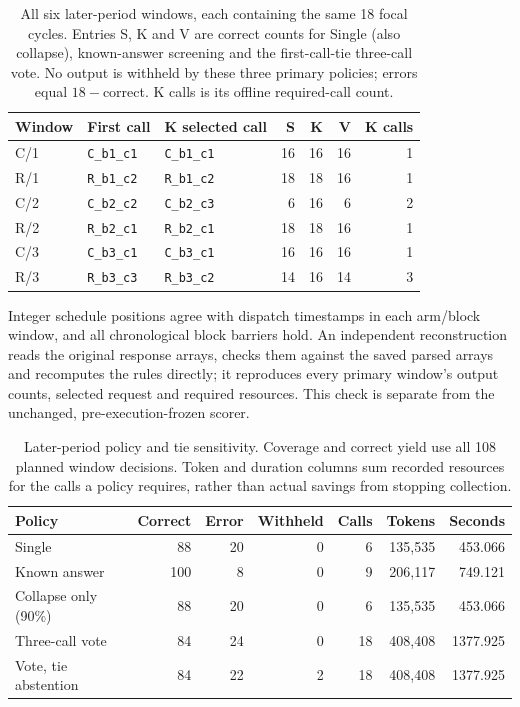 \begin{table}[htbp]\centering\small
\caption{All six later-period windows, each containing the same 18 focal cycles. Entries S, K and V are correct counts for Single (also collapse), known-answer screening and the first-call-tie three-call vote. No output is withheld by these three primary policies; errors equal $18-$correct. K calls is its offline required-call count.}
\label{tab:canary_stability_windows}
\begin{tabular}{@{}ll lrrrr@{}}\toprule
Window & First call & K selected call & S & K & V & K calls \\\midrule
C/1 & \texttt{C\_b1\_c1} & \texttt{C\_b1\_c1} & 16 & 16 & 16 & 1 \\
R/1 & \texttt{R\_b1\_c2} & \texttt{R\_b1\_c2} & 18 & 18 & 16 & 1 \\
C/2 & \texttt{C\_b2\_c2} & \texttt{C\_b2\_c3} & 6 & 16 & 6 & 2 \\
R/2 & \texttt{R\_b2\_c1} & \texttt{R\_b2\_c1} & 18 & 18 & 16 & 1 \\
C/3 & \texttt{C\_b3\_c1} & \texttt{C\_b3\_c1} & 16 & 16 & 16 & 1 \\
R/3 & \texttt{R\_b3\_c3} & \texttt{R\_b3\_c2} & 14 & 16 & 14 & 3 \\
\bottomrule\end{tabular}\end{table}

Integer schedule positions agree with dispatch timestamps in each arm/block window, and all chronological block barriers hold. An independent reconstruction reads the original response arrays, checks them against the saved parsed arrays and recomputes the rules directly; it reproduces every primary window's output counts, selected request and required resources. This check is separate from the unchanged, pre-execution-frozen scorer.

\begin{table}[htbp]\centering\small
\caption{Later-period policy and tie sensitivity. Coverage and correct yield use all 108 planned window decisions. Token and duration columns sum recorded resources for the calls a policy requires, rather than actual savings from stopping collection.}
\label{tab:canary_stability_policies}
\begin{tabular}{@{}lrrrrrr@{}}\toprule
Policy & Correct & Error & Withheld & Calls & Tokens & Seconds \\\midrule
Single & 88 & 20 & 0 & 6 & 135,535 & 453.066 \\
Known answer & 100 & 8 & 0 & 9 & 206,117 & 749.121 \\
Collapse only (90\%) & 88 & 20 & 0 & 6 & 135,535 & 453.066 \\
Three-call vote & 84 & 24 & 0 & 18 & 408,408 & 1377.925 \\
Vote, tie abstention & 84 & 22 & 2 & 18 & 408,408 & 1377.925 \\
\bottomrule\end{tabular}\end{table}

